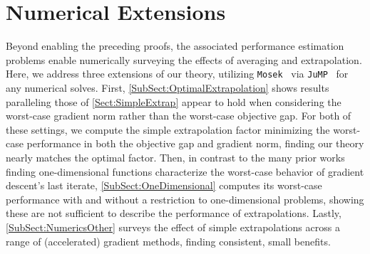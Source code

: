 \documentclass[11pt]{article}
\numberwithin{equation}{section}
\theoremstyle{definition}
\theoremstyle{definition}
\theoremstyle{definition}
\newcommand{\1}{\mathbf{1}}
\begin{document}
\section{Numerical Extensions} \label{Sect:Numerics}
Beyond enabling the preceding proofs, the associated performance estimation problems enable numerically surveying the effects of averaging and extrapolation. Here, we address three extensions of our theory, utilizing \texttt{Mosek}~\cite{mosek} via \texttt{JuMP}~\cite{JuMP} for any numerical solves. First, \cref{SubSect:OptimalExtrapolation} shows results paralleling those of \cref{Sect:SimpleExtrap} appear to hold when considering the worst-case gradient norm rather than the worst-case objective gap. For both of these settings, we compute the simple extrapolation factor minimizing the worst-case performance in both the objective gap and gradient norm, finding our theory nearly matches the optimal factor. Then, in contrast to the many prior works finding one-dimensional functions characterize the worst-case behavior of gradient descent's last iterate, \cref{SubSect:OneDimensional} computes its worst-case performance with and without a restriction to one-dimensional problems, showing these are not sufficient to describe the performance of extrapolations. Lastly, \cref{SubSect:NumericsOther} surveys the effect of simple extrapolations across a range of (accelerated) gradient methods, finding consistent, small benefits.
\end{document}
